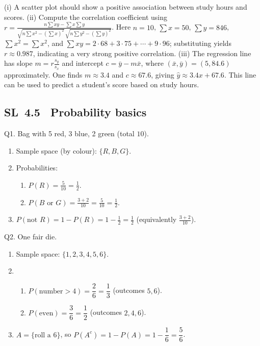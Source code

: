 \documentclass[11pt]{article}
\def\textbf#1{#1}%
\newcommand{\tocsubsection}[1]{\subsection{#1}}
\begin{document}
\begin{solution}
(i) A scatter plot should show a positive association between study hours and
scores.  (ii) Compute the correlation coefficient using
\(r=\frac{n\sum xy-\sum x\sum y}{\sqrt{n\sum x^2-(\sum x)^2}\,\sqrt{n\sum y^2-(\sum y)^2}}\).
Here $n=10$, $\sum x=50$, $\sum y=846$, $\sum x^2=\sum x^2$, and
$\sum xy=2\cdot68+3\cdot75+\cdots+9\cdot96$; substituting yields
$r\approx0.987$, indicating a very strong positive correlation.  (iii)
The regression line has slope
$m=r\tfrac{s_y}{s_x}$ and intercept $c=\bar{y}-m\bar{x}$, where
$(\bar{x},\bar{y})=(5,84.6)$ approximately.  One finds $m\approx3.4$ and
$c\approx67.6$, giving $\hat{y}\approx3.4x+67.6$.  This line can be used to
predict a student’s score based on study hours.
\end{solution}

\tocsubsection{SL 4.5 \; Probability basics}


\begin{solution}
\textbf{Q1. Bag with 5 red, 3 blue, 2 green (total $10$).}
\begin{enumerate}
  \item Sample space (by colour): $\{R,B,G\}$.
  \item Probabilities:
    \begin{enumerate}
      \item $\displaystyle P(R)=\frac{5}{10}=\frac{1}{2}$.
      \item $\displaystyle P(B\text{ or }G)=\frac{3+2}{10}=\frac{5}{10}=\frac{1}{2}$.
    \end{enumerate}
  \item $\displaystyle P(\text{not }R)=1-P(R)=1-\tfrac12=\tfrac12$ \; (equivalently $\tfrac{3+2}{10}$).
\end{enumerate}
\end{solution}

\begin{solution}
\textbf{Q2. One fair die.}
\begin{enumerate}
  \item Sample space: $\{1,2,3,4,5,6\}$.
  \item
    \begin{enumerate}
      \item $P(\text{number}>4)=\dfrac{2}{6}=\dfrac{1}{3}$ (outcomes $5,6$).
      \item $P(\text{even})=\dfrac{3}{6}=\dfrac{1}{2}$ (outcomes $2,4,6$).
    \end{enumerate}
  \item $A=\{\text{roll a 6}\}$, so $P(A^c)=1-P(A)=1-\dfrac{1}{6}=\dfrac{5}{6}$.
\end{enumerate}
\end{solution}
\end{document}

